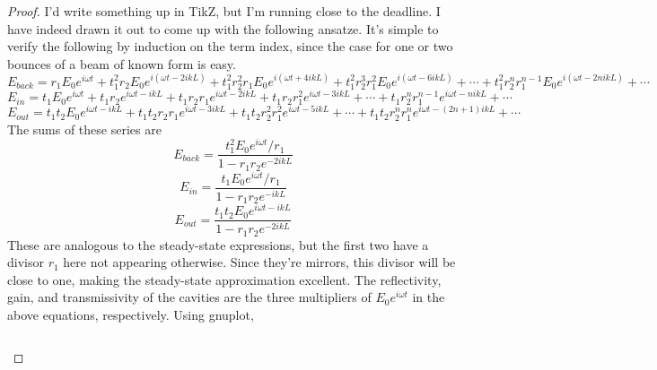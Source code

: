 \documentclass{article}
\begin{document}
\begin{proof}
  I'd write something up in  TikZ, but I'm running close to the deadline.
  I have indeed drawn it out to come up with the following ansatze.
  It's simple to verify the following by induction on the term index, since the case for one or two bounces of a beam of known form is easy.
  \[
    E_{back} = r_{1}E_{0}e^{i\omega t} + t_{1}^{2}r_{2}E_{0}e^{i (\omega t - 2ikL)} + t_{1}^{2}r_{2}^{2}r_{1}E_{0}e^{i(\omega t + 4ikL)}
    + t_{1}^{2}r_{2}^{3}r_{1}^{2}E_{0}e^{i(\omega t - 6ikL)} + \cdots + t_{1}^{2}r_{2}^{n}r_{1}^{n - 1}E_{0}e^{i(\omega t - 2nikL)} + \cdots
  \]
  \[
    E_{in} = t_{1}E_{0}e^{i\omega t} + t_{1}r_{2}e^{i\omega t - ikL} + t_{1}r_{2}r_{1}e^{i\omega t - 2ikL} + t_{1}r_{2}r_{1}^{2}e^{i\omega t - 3ikL}
    + \cdots + t_{1}r_{2}^{n}r_{1}^{n-1}e^{i\omega t - nikL} + \cdots
  \]
  \[
    E_{out} = t_{1}t_{2}E_{0}e^{i\omega t - ikL} + t_{1}t_{2}r_{2}r_{1}e^{i\omega t - 3ikL} + t_{1}t_{2}r_{2}^{2}r_{1}^{2}e^{i\omega t - 5ikL}
    + \cdots + t_{1}t_{2}r_{2}^{n}r_{1}^{n}e^{i\omega t - (2n + 1)ikL} + \cdots
  \]
  The sums of these series are
  \[
    E_{back} = \frac{t_{1}^{2}E_{0}e^{i\omega t}/r_{1}}{1 - r_{1}r_{2}e^{-2ikL}}
  \]
  \[
    E_{in} = \frac{t_{1}E_{0}e^{i\omega t}/r_{1}}{1 - r_{1}r_{2}e^{-ikL}}
  \]
  \[
    E_{out}= \frac{t_{1}t_{2}E_{0}e^{i\omega t - ikL}}{1 - r_{1}r_{2}e^{-2ikL}}
  \]
  These are analogous to the steady-state expressions, but the first two have a divisor $r_{1}$ here not appearing otherwise.
  Since they're mirrors, this divisor will be close to one, making the steady-state approximation excellent.
  The reflectivity, gain, and transmissivity of the cavities are the three multipliers of $E_{0}e^{i\omega t}$ in the above equations, respectively.
  Using gnuplot,
  \inputminted{gnuplot}{p4.gp}
  \begin{center}
    
  \end{center}
\end{proof}
\end{document}
